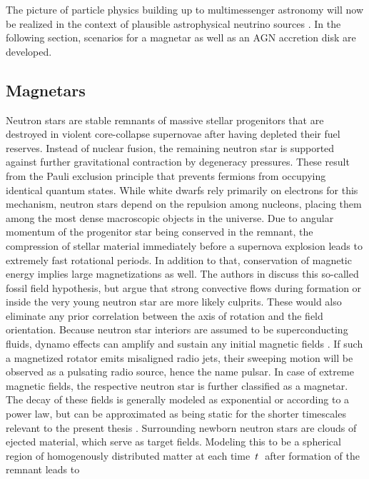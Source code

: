 The picture of particle physics building up to multimessenger astronomy will now be realized in the context of plausible astrophysical
neutrino sources \cite{Becker_2008}. In the following section, scenarios for a magnetar as well as an AGN accretion disk are developed.



\subsection{Magnetars}
\label{sub:magnetars}

Neutron stars are stable remnants of massive stellar progenitors that are destroyed in violent core-collapse supernovae after having
depleted their fuel reserves. Instead of nuclear fusion, the remaining neutron star is supported against further gravitational
contraction by degeneracy pressures. These result from the Pauli exclusion principle that prevents fermions from occupying identical
quantum states. While white dwarfs rely primarily on electrons for this mechanism, neutron stars depend on the repulsion among
nucleons, placing them among the most dense macroscopic objects in the universe. Due to angular momentum of the progenitor
star being conserved in the remnant, the compression of stellar material immediately before a supernova explosion leads to
extremely fast rotational periods. In addition to that, conservation of magnetic energy implies large magnetizations as well.
The authors in \cite{Thompson_1993} discuss this so-called fossil field hypothesis, but argue that strong convective flows
during formation or inside the very young neutron star are more likely culprits. These would also eliminate any prior correlation
between the axis of rotation and the field orientation. Because neutron star interiors are assumed to be superconducting fluids,
dynamo effects can amplify and sustain any initial magnetic fields \cite{Haskell_2018}. If such a magnetized rotator emits misaligned
radio jets, their sweeping motion will be observed as a pulsating radio source, hence the name pulsar. In case of extreme magnetic
fields, the respective neutron star is further classified as a magnetar. The decay of these fields is generally modeled
as exponential or according to a power law, but can be approximated as being static for the shorter timescales relevant to the present
thesis \cite{Sang_1990}. Surrounding newborn neutron stars are clouds of ejected material, which serve as target fields. Modeling this
to be a spherical region of homogenously distributed matter at each time~$t \kern+0.5pt$~after formation of the remnant leads to
